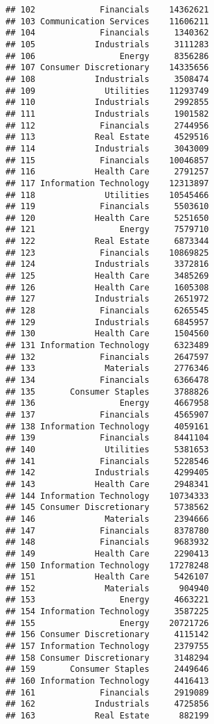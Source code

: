 \documentclass[
]{article}
\begin{document}
\begin{verbatim}
## 102             Financials    14362621
## 103 Communication Services    11606211
## 104             Financials     1340362
## 105            Industrials     3111283
## 106                 Energy     8356286
## 107 Consumer Discretionary    14335656
## 108            Industrials     3508474
## 109              Utilities    11293749
## 110            Industrials     2992855
## 111            Industrials     1901582
## 112             Financials     2744956
## 113            Real Estate     4529516
## 114            Industrials     3043009
## 115             Financials    10046857
## 116            Health Care     2791257
## 117 Information Technology    12313897
## 118              Utilities    10545466
## 119             Financials     5503610
## 120            Health Care     5251650
## 121                 Energy     7579710
## 122            Real Estate     6873344
## 123             Financials    10869825
## 124            Industrials     3372816
## 125            Health Care     3485269
## 126            Health Care     1605308
## 127            Industrials     2651972
## 128             Financials     6265545
## 129            Industrials     6845957
## 130            Health Care     1504560
## 131 Information Technology     6323489
## 132             Financials     2647597
## 133              Materials     2776346
## 134             Financials     6366478
## 135       Consumer Staples     3788826
## 136                 Energy     4667958
## 137             Financials     4565907
## 138 Information Technology     4059161
## 139             Financials     8441104
## 140              Utilities     5381653
## 141             Financials     5228546
## 142            Industrials     4299405
## 143            Health Care     2948341
## 144 Information Technology    10734333
## 145 Consumer Discretionary     5738562
## 146              Materials     2394666
## 147             Financials     8378780
## 148             Financials     9683932
## 149            Health Care     2290413
## 150 Information Technology    17278248
## 151            Health Care     5426107
## 152              Materials      904940
## 153                 Energy     4663221
## 154 Information Technology     3587225
## 155                 Energy    20721726
## 156 Consumer Discretionary     4115142
## 157 Information Technology     2379755
## 158 Consumer Discretionary     3148294
## 159       Consumer Staples     2449646
## 160 Information Technology     4416413
## 161             Financials     2919089
## 162            Industrials     4725856
## 163            Real Estate      882199

\end{verbatim}
\end{document}
